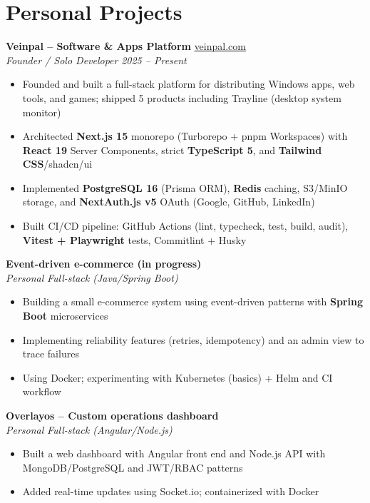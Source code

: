 \documentclass[10pt,a4paper]{article}
\begin{document}
\vspace{4pt}
\section*{Personal Projects}
{\small
\textbf{Veinpal -- Software \& Apps Platform} \hfill \href{https://veinpal.com}{veinpal.com}\\[1pt]
\textit{Founder / Solo Developer} \hfill \textit{2025 -- Present}
\begin{itemize}
  \item Founded and built a full-stack platform for distributing Windows apps, web tools, and games; shipped 5 products including Trayline (desktop system monitor)
  \item Architected \textbf{Next.js 15} monorepo (Turborepo + pnpm Workspaces) with \textbf{React 19} Server Components, strict \textbf{TypeScript 5}, and \textbf{Tailwind CSS}/shadcn/ui
  \item Implemented \textbf{PostgreSQL 16} (Prisma ORM), \textbf{Redis} caching, S3/MinIO storage, and \textbf{NextAuth.js v5} OAuth (Google, GitHub, LinkedIn)
  \item Built CI/CD pipeline: GitHub Actions (lint, typecheck, test, build, audit), \textbf{Vitest + Playwright} tests, Commitlint + Husky
\end{itemize}

\vspace{2pt}
\textbf{Event-driven e-commerce (in progress)}\\[1pt]
\textit{Personal} \hfill \textit{Full-stack (Java/Spring Boot)}
\begin{itemize}
  \item Building a small e-commerce system using event-driven patterns with \textbf{Spring Boot} microservices
  \item Implementing reliability features (retries, idempotency) and an admin view to trace failures
  \item Using Docker; experimenting with Kubernetes (basics) + Helm and CI workflow
\end{itemize}

\vspace{2pt}
\textbf{Overlayos -- Custom operations dashboard}\\[1pt]
\textit{Personal} \hfill \textit{Full-stack (Angular/Node.js)}
\begin{itemize}
  \item Built a web dashboard with Angular front end and Node.js API with MongoDB/PostgreSQL and JWT/RBAC patterns
  \item Added real-time updates using Socket.io; containerized with Docker
\end{itemize}
}
\end{document}
